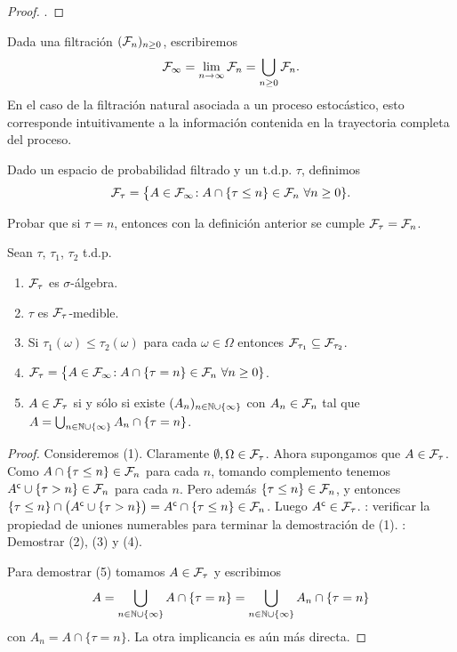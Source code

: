 \begin{proof}
\uexer.
\end{proof}

Dada una filtración $(\mathcal{F}_n)_{n\geq0}$, escribiremos
\[\mathcal{F}_\infty=\lim_{n\to\infty}\mathcal{F}_n=\bigcup_{n\geq0}\mathcal{F}_n.\]
En el caso de la filtración natural asociada a un proceso estocástico, esto corresponde intuitivamente a la información contenida en la trayectoria completa del proceso.

\begin{defn}
Dado un espacio de probabilidad filtrado y un t.d.p. $\tau$, definimos
\[\mathcal{F}_\tau=\big\{A\in\mathcal{F}_\infty\!:A\cap\{\tau\leq n\}\in\mathcal{F}_n~\forall n\geq0\}.\]
\end{defn}

\begin{ex}
Probar que si $\tau=n$, entonces con la definición anterior se cumple $\mathcal{F}_\tau=\mathcal{F}_n$.
\end{ex}

\begin{prop}
Sean $\tau$, $\tau_1$, $\tau_2$ t.d.p.
\begin{enumerate}[label=\uptext{(\arabic*)}]
\item $\mathcal{F}_\tau$ es $\sigma$-álgebra.
\item $\tau$ es $\mathcal{F}_\tau$-medible.
\item Si $\tau_1(\omega)\leq\tau_2(\omega)$ para cada $\omega\in\Omega$ entonces $\mathcal{F}_{\tau_1}\subseteq\mathcal{F}_{\tau_2}$.
\item $\mathcal{F}_\tau=\big\{A\in\mathcal{F}_\infty\!:A\cap\{\tau= n\}\in\mathcal{F}_n~\forall n\geq0\}$.
\item $A\in\mathcal{F}_\tau$ si y sólo si existe $(A_n)_{n\in\mathbb{N}\cup\{\infty\}}$ con $A_n\in\mathcal{F}_n$ tal que $A=\bigcup_{n\in\mathbb{N}\cup\{\infty\}}A_n\cap\{\tau=n\}$.
\end{enumerate}
\end{prop}

\begin{proof}
Consideremos (1).
Claramente $\emptyset,\Omega\in\mathcal{F}_\tau$.
Ahora supongamos que $A\in\mathcal{F}_\tau$.
Como $A\cap\{\tau\leq n\}\in\mathcal{F}_n$ para cada $n$, tomando complemento tenemos $A^{\sf c}\cup\{\tau>n\}\in\mathcal{F}_n$ para cada $n$.
Pero además $\{\tau\leq n\}\in\mathcal{F}_n$, y entonces $\{\tau\leq n\}\cap\big(A^{\sf c}\cup\{\tau>n\}\big)=A^{\sf c}\cap\{\tau\leq n\}\in\mathcal{F}_n$.
Luego $A^{\sf c}\in\mathcal{F}_\tau$.
\uexer: verificar la propiedad de uniones numerables para terminar la demostración de (1).
\uexer: Demostrar (2), (3) y (4).

Para demostrar (5) tomamos $A\in\mathcal{F}_\tau$ y escribimos
\[A=\bigcup_{n\in\mathbb{N}\cup\{\infty\}}A\cap\{\tau=n\}=\bigcup_{n\in\mathbb{N}\cup\{\infty\}}A_n\cap\{\tau=n\}\]
con $A_n=A\cap\{\tau=n\}$.
La otra implicancia es aún más directa.
\end{proof}

